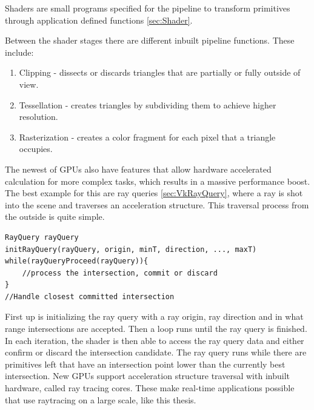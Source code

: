 Shaders are small programs specified for the pipeline to transform primitives through application defined functions \ref{sec:Shader}. 

Between the shader stages there are different inbuilt pipeline functions. These include:
\begin{enumerate}
    \item Clipping - dissects or discards triangles that are partially or fully outside of view.
    \item Tessellation - creates triangles by subdividing them to achieve higher resolution.
    \item Rasterization - creates a color fragment for each pixel that a triangle occupies.
\end{enumerate}

The newest of GPUs also have features that allow hardware accelerated calculation for more complex tasks, which results in a massive performance boost.\\
The best example for this are ray queries \ref{sec:VkRayQuery}, where a ray is shot into the scene and traverses an acceleration structure. This traversal process from the outside is quite simple.
\begin{lstlisting}
RayQuery rayQuery
initRayQuery(rayQuery, origin, minT, direction, ..., maxT)
while(rayQueryProceed(rayQuery)){
    //process the intersection, commit or discard
}
//Handle closest committed intersection
\end{lstlisting}
First up is initializing the ray query with a ray origin, ray direction and in what range intersections are accepted. Then a loop runs until the ray query is finished. In each iteration, the shader is then able to access the ray query data and either confirm or discard the intersection candidate.
The ray query runs while there are primitives left that have an intersection point lower than the currently best intersection. New GPUs support acceleration structure traversal with inbuilt hardware, called ray tracing cores. These make real-time applications possible that use raytracing on a large scale, like this thesis.

